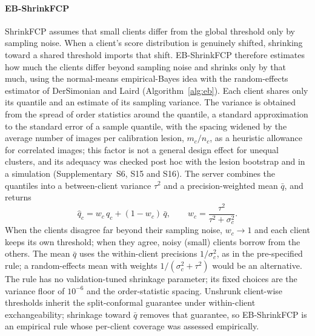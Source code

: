\documentclass[VANCOUVER,Times1COL]{WileyNJDv5}
\begin{document}
\paragraph{EB-ShrinkFCP} ShrinkFCP assumes that small clients differ from the global threshold only by
sampling noise. When a client's score distribution is genuinely shifted, shrinking toward a shared
threshold imports that shift. EB-ShrinkFCP therefore estimates how much the clients differ beyond sampling
noise and shrinks only by that much, using the normal-means empirical-Bayes idea
\cite{efron1975stein} with the random-effects estimator of DerSimonian and Laird
\cite{dersimonian1986meta} (Algorithm~\ref{alg:eb}). Each client shares only its quantile and an estimate
of its sampling variance. The variance is obtained from the spread of order statistics around the
quantile, a standard approximation to the standard error of a sample quantile, with the spacing widened
by the average number of images per calibration lesion, $m_c/n_c$, as a heuristic allowance for
correlated images; this factor is not a general design effect for unequal clusters, and its adequacy was
checked post hoc with the lesion bootstrap and in a simulation (Supplementary~S6, S15 and S16). The server combines the quantiles into a
between-client variance $\tau^2$ and a precision-weighted mean $\bar q$, and returns
\begin{equation}
  \hat q_c = w_c\,q_c + (1-w_c)\,\bar q, \qquad w_c=\frac{\tau^2}{\tau^2+\sigma_c^2}.
  \label{eq:eb}
\end{equation}
When the clients disagree far beyond their sampling noise, $w_c\to1$ and each client keeps its own
threshold; when they agree, noisy (small) clients borrow from the others. The mean $\bar q$ uses the
within-client precisions $1/\sigma_c^2$, as in the pre-specified rule; a random-effects mean with weights
$1/(\sigma_c^2+\tau^2)$ would be an alternative. The rule has no validation-tuned shrinkage parameter; its
fixed choices are the variance floor of $10^{-6}$ and the order-statistic spacing. Unshrunk client-wise
thresholds inherit the split-conformal guarantee under within-client exchangeability; shrinkage toward
$\bar q$ removes that guarantee, so EB-ShrinkFCP is an empirical rule whose per-client coverage was
assessed empirically.
\end{document}
